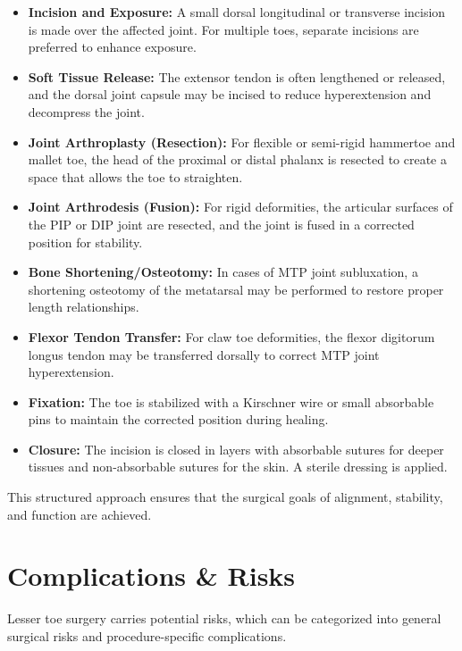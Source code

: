 \begin{itemize}
  \item \textbf{Incision and Exposure:} A small dorsal longitudinal or transverse incision is made over the affected joint. For multiple toes, separate incisions are preferred to enhance exposure.
  
  \item \textbf{Soft Tissue Release:} The extensor tendon is often lengthened or released, and the dorsal joint capsule may be incised to reduce hyperextension and decompress the joint.
  
  \item \textbf{Joint Arthroplasty (Resection):} For flexible or semi-rigid hammertoe and mallet toe, the head of the proximal or distal phalanx is resected to create a space that allows the toe to straighten.
  
  \item \textbf{Joint Arthrodesis (Fusion):} For rigid deformities, the articular surfaces of the PIP or DIP joint are resected, and the joint is fused in a corrected position for stability.
  
  \item \textbf{Bone Shortening/Osteotomy:} In cases of MTP joint subluxation, a shortening osteotomy of the metatarsal may be performed to restore proper length relationships.
  
  \item \textbf{Flexor Tendon Transfer:} For claw toe deformities, the flexor digitorum longus tendon may be transferred dorsally to correct MTP joint hyperextension.
  
  \item \textbf{Fixation:} The toe is stabilized with a Kirschner wire or small absorbable pins to maintain the corrected position during healing.
  
  \item \textbf{Closure:} The incision is closed in layers with absorbable sutures for deeper tissues and non-absorbable sutures for the skin. A sterile dressing is applied.
\end{itemize}

This structured approach ensures that the surgical goals of alignment, stability, and function are achieved.

\section*{Complications \& Risks}
Lesser toe surgery carries potential risks, which can be categorized into general surgical risks and procedure-specific complications.

